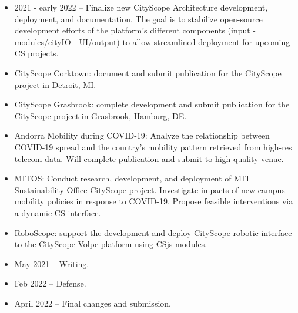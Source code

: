 \begin{itemize}
\item {2021 - early 2022 -- Finalize new CityScope Architecture development, deployment, and documentation. The goal is to stabilize open-source development efforts of the platform's different components (input - modules/cityIO - UI/output) to allow streamlined deployment for upcoming CS projects.}
	
\item CityScope Corktown: document and submit publication for the CityScope project in Detroit, MI. 

\item {CityScope Grasbrook: complete development and submit publication for the CityScope project in Grasbrook, Hamburg, DE.}
	
\item {Andorra Mobility during COVID-19: Analyze the relationship between COVID-19 spread and the country's mobility pattern retrieved from high-res telecom data. Will complete publication and submit to high-quality venue.}
	
\item {MITOS: Conduct research, development, and deployment of MIT Sustainability Office CityScope project. Investigate impacts of new campus mobility policies in response to COVID-19. Propose feasible interventions via a dynamic CS interface.}  
	
\item {RoboScope: support the development and deploy CityScope robotic interface to the CityScope Volpe platform using CSjs modules.}

\item May 2021 -- Writing. 
\item Feb 2022 -- Defense.
\item April 2022 -- Final changes and submission. 
\end{itemize}